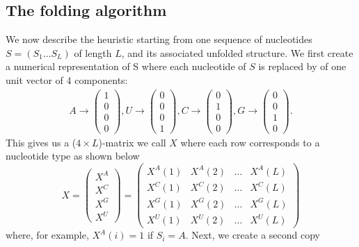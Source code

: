 \documentclass[a4paper,12pt]{article}
\begin{document}
\subsection*{The folding algorithm}
\label{sec:org1684ddc}
We now describe the heuristic starting from one sequence of nucleotides
\(S=(S_1\dots S_L)\) of length \(L\), and its associated unfolded structure. We
first create a numerical representation of S where each nucleotide of \(S\) is
replaced by of one unit vector of 4 components:
\begin{equation}
\begin{split}
A \rightarrow \begin{pmatrix} 1\\ 0\\ 0\\ 0 \end{pmatrix},
U \rightarrow \begin{pmatrix} 0\\ 0\\ 0\\ 1 \end{pmatrix},
C \rightarrow \begin{pmatrix} 0\\ 1\\ 0\\ 0 \end{pmatrix},
G \rightarrow \begin{pmatrix} 0\\ 0\\ 1\\ 0 \end{pmatrix}.
\end{split}
\end{equation}
This gives us a (\(4 \times L\))-matrix we call \(X\) where each row corresponds to
a nucleotide type as shown below
\begin{equation}
X = \begin{pmatrix} X^A\\ X^C\\ X^G\\ X^U \end{pmatrix} = \begin{pmatrix} X^A(1) &X^A(2) &\dots &X^A(L) \\ X^C(1) &X^C(2) &\dots &X^C(L)\\ X^G(1) &X^G(2) &\dots &X^G(L)\\ X^U(1) &X^U(2) &\dots &X^U(L) \end{pmatrix}
\end{equation}
where, for example, \(X^A(i) = 1\) if \(S_i = A\). Next, we create a second copy
\end{document}
